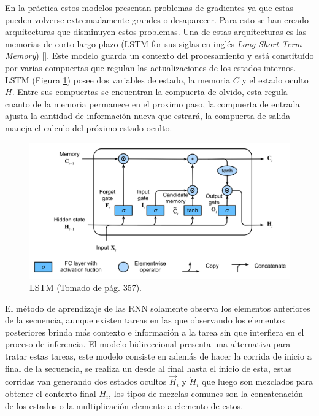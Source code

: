 En la práctica estos modelos presentan problemas de gradientes ya que estas pueden volverse extremadamente grandes o 
desaparecer.
Para esto se han creado arquitecturas que disminuyen estos problemas. Una de estas arquitecturas es las memorias
de corto largo plazo (LSTM for sus siglas en inglés \emph{Long Short Term Memory}) [\cite{hochreiter1997long}].
Este modelo guarda un contexto del procesamiento y está constituído por varias compuertas que regulan las 
actualizaciones de los estados internos. LSTM (Figura \ref{fig:rnn_lstm}) posee dos variables de estado, la memoria 
$C$ y el estado oculto $H$. Entre sus compuertas se encuentran la compuerta de olvido, esta regula cuanto de la 
memoria permanece en el proximo paso, la compuerta de entrada ajusta la cantidad de información nueva que estrará, 
la compuerta de salida maneja el calculo del próximo estado oculto.

\begin{figure}[h!]
	\begin{center}
		\begin{center}
			\includegraphics[scale=.3]{Graphics/rnn_lstm.png}
        \end{center}
	    \caption{LSTM (Tomado de \cite{d2l} pág. 357).}\label{fig:rnn_lstm}
	\end{center}
\end{figure}

El método de aprendizaje de las RNN solamente observa los elementos anteriores de la secuencia, aunque existen
tareas en las que observando los elementos posteriores brinda más contexto e información a la tarea sin que interfiera
en el proceso de inferencia. El modelo bidireccional presenta una alternativa para tratar estas tareas, este modelo
consiste en además de hacer la corrida de inicio a final de la secuencia, se realiza un desde al final hasta el  
inicio de esta, estas corridas van generando dos estados ocultos $\overrightarrow{H}_{i}$ y $\overleftarrow{H}_{i}$
que luego son mezclados para obtener el contexto final $H_i$, los tipos de mezclas comunes son la concatenación de los 
estados o la multiplicación elemento a elemento de estos.

